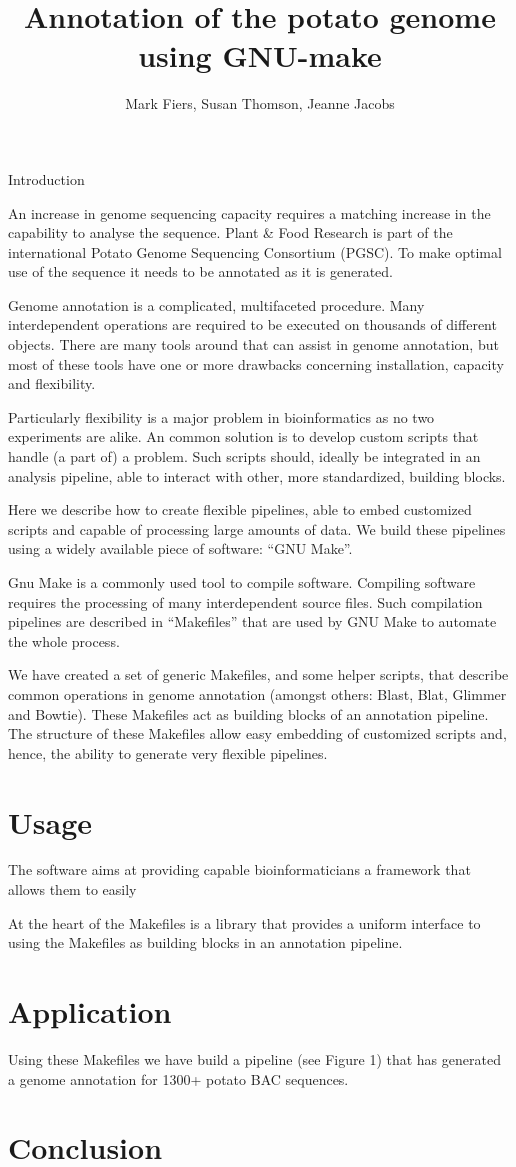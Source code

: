 \documentclass[a4paper,11pt,oneside]{article}
\begin{document}
\title{Annotation of the potato genome using GNU-make}
\author{Mark Fiers, Susan Thomson, Jeanne Jacobs}

Introduction

An increase in genome sequencing capacity requires a matching increase in
the capability to analyse the sequence. Plant \& Food Research is part
of the international Potato Genome Sequencing Consortium (PGSC). To
make optimal use of the sequence it needs to be annotated as it is
generated. 

Genome annotation is a complicated, multifaceted procedure. Many
interdependent operations are required to be executed on thousands of
different objects. There are many tools around that can assist in
genome annotation, but most of these tools have one or more drawbacks
concerning installation, capacity and flexibility.

Particularly flexibility is a major problem in bioinformatics as no
two experiments are alike. An common solution is to develop custom
scripts that handle (a part of) a problem. Such scripts should,
ideally be integrated in an analysis pipeline, able to interact with
other, more standardized, building blocks.

Here we describe how to create flexible pipelines, able to embed
customized scripts and capable of processing large amounts of data. We
build these pipelines using a widely available piece of software:
``GNU Make''.

Gnu Make is a commonly used tool to compile software. Compiling
software requires the processing of many interdependent source
files. Such compilation pipelines are described in ``Makefiles'' that
are used by GNU Make to automate the whole process.

We have created a set of generic Makefiles, and some helper scripts,
that describe common operations in genome annotation (amongst others:
Blast, Blat, Glimmer and Bowtie). These Makefiles act as building
blocks of an annotation pipeline. The structure of these Makefiles
allow easy embedding of customized scripts and, hence, the ability to
generate very flexible pipelines.

\section{Usage}

The software aims at providing capable bioinformaticians a framework
that allows them to easily

At the heart of the Makefiles is a library that provides a uniform
interface to using the Makefiles as building blocks in an annotation
pipeline. 


\section{Application}

Using these Makefiles we have build a pipeline (see Figure 1) that has
generated a genome annotation for 1300+ potato BAC sequences.

\section{Conclusion}



\end{document}
